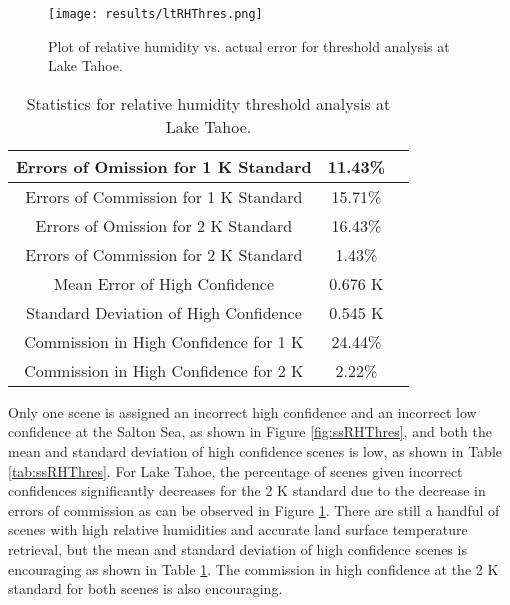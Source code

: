 \documentclass{book}
\begin{document}
\begin{minipage}[c]{0.47\textwidth}
\centering
\begin{figure}[H]
\texttt{[image: results/ltRHThres.png]}
\caption{Plot of relative humidity vs. actual error for threshold analysis at Lake Tahoe.}
\label{fig:ltRHThres}
\end{figure}
\end{minipage}
\begin{minipage}[c]{0.47\textwidth}
\begin{table}[H]
\centering
\footnotesize
\begin{tabular}{ | c | c | c | } \hline
Errors of Omission for 1 K Standard & 11.43\% \\ \hline
Errors of Commission for 1 K Standard & 15.71\% \\ \hline
Errors of Omission for 2 K Standard & 16.43\% \\ \hline
Errors of Commission for 2 K Standard & 1.43\% \\ \hline
Mean Error of High Confidence & 0.676 K \\ \hline
Standard Deviation of High Confidence & 0.545 K \\ \hline
Commission in High Confidence for 1 K & 24.44\% \\ \hline
Commission in High Confidence for 2 K & 2.22\% \\ \hline
\end{tabular}
\caption{Statistics for relative humidity threshold analysis at Lake Tahoe.}
\label{tab:ltRHThres}
\end{table}
\end{minipage}

Only one scene is assigned an incorrect high confidence and an incorrect low confidence at the Salton Sea, as shown in Figure \ref{fig:ssRHThres}, and both the mean and standard deviation of high confidence scenes is low, as shown in Table \ref{tab:ssRHThres}.  For Lake Tahoe, the percentage of scenes given incorrect confidences significantly decreases for the 2 K standard due to the decrease in errors of commission as can be observed in Figure \ref{fig:ltRHThres}.  There are still a handful of scenes with high relative humidities and accurate land surface temperature retrieval, but the mean and standard deviation of high confidence scenes is encouraging as shown in Table \ref{tab:ltRHThres}.  The commission in high confidence at the 2 K standard for both scenes is also encouraging.
\end{document}
